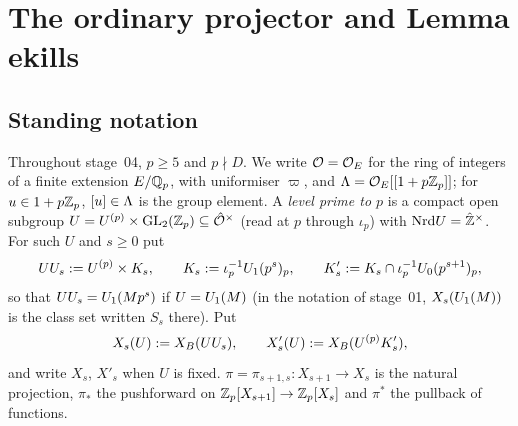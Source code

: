 \section{The ordinary projector and Lemma ekills}

\subsection{Standing notation}\label{ss:s04-notation}
Throughout stage~04, $p\ge5$ and $p\nmid D$. We write $\mathcal{O}=\mathcal{O}_E$ for the ring of integers of a finite extension $E/\mathbb{Q}_p$, with
uniformiser $\varpi$, and $\Lambda=\mathcal{O}_E[[1+p\mathbb{Z}_p]]$; for $u\in1+p\mathbb{Z}_p$, $[u]\in\Lambda$ is the group element. A \emph{level prime to $p$}
is a compact open subgroup $U=U^{(p)}\times\mathrm{GL}_2(\mathbb{Z}_p)\subseteq\hat{\mathcal{O}}^\times$ (read at $p$ through $\iota_p$) with $\mathrm{Nrd} U=\hat{\mathbb{Z}}^\times$.
For such $U$ and $s\ge0$ put
\[UU_s:=U^{(p)}\times K_{s},\qquad K_{s}:=\iota_p^{-1}U_1(p^s)_p,\qquad K'_{s}:=K_{s}\cap\iota_p^{-1}U_0(p^{s+1})_p,\]
so that $UU_s=U_1(Mp^s)$ if $U=U_1(M)$ (in the notation of stage~01, $X_s(U_1(M))$ is the class set written $S_s$ there). Put
\[X_s(U):=X_B(UU_s),\qquad X'_s(U):=X_B(U^{(p)}K'_{s}),\]
and write $X_s$, $X'_s$ when $U$ is fixed. $\pi=\pi_{s+1,s}:X_{s+1}\to X_s$ is the natural projection, $\pi_*$ the pushforward on
$\mathbb{Z}_p[X_{s+1}]\to\mathbb{Z}_p[X_s]$ and $\pi^*$ the pullback of functions.

